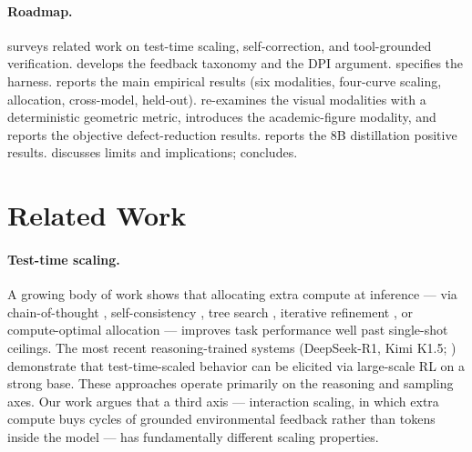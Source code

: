 \documentclass[11pt]{article}
\begin{document}
\paragraph{Roadmap.}  surveys related work on test-time scaling, self-correction, and tool-grounded verification.  develops the feedback taxonomy and the DPI argument.  specifies the harness.  reports the main empirical results (six modalities, four-curve scaling, allocation, cross-model, held-out).  re-examines the visual modalities with a deterministic geometric metric, introduces the academic-figure modality, and reports the objective defect-reduction results.  reports the 8B distillation positive results.  discusses limits and implications;  concludes.

\section{Related Work}
\label{sec:related}

\paragraph{Test-time scaling.} A growing body of work shows that allocating extra compute at inference --- via chain-of-thought \citep{wei2022chain}, self-consistency \citep{wang2023selfconsistency}, tree search \citep{yao2023tree}, iterative refinement \citep{shinn2023reflexion,madaan2023selfrefine}, or compute-optimal allocation \citep{snell2024scaling,beeching2024searchscale} --- improves task performance well past single-shot ceilings. The most recent reasoning-trained systems (DeepSeek-R1, Kimi K1.5; \citealp{deepseek2025r1,kimi2025k15}) demonstrate that test-time-scaled behavior can be elicited via large-scale RL on a strong base. These approaches operate primarily on the reasoning and sampling axes. Our work argues that a third axis --- interaction scaling, in which extra compute buys cycles of grounded environmental feedback rather than tokens inside the model --- has fundamentally different scaling properties.
\end{document}
